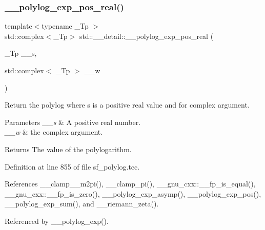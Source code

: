 \subsubsection{\texorpdfstring{\+\_\+\+\_\+polylog\+\_\+exp\+\_\+pos\+\_\+real()}{\_\_polylog\_exp\_pos\_real()}\hspace{0.1cm}{\footnotesize\ttfamily [1/2]}}
{\footnotesize\ttfamily template$<$typename \+\_\+\+Tp $>$ \\
std\+::complex$<$\+\_\+\+Tp$>$ std\+::\+\_\+\+\_\+detail\+::\+\_\+\+\_\+polylog\+\_\+exp\+\_\+pos\+\_\+real (\begin{DoxyParamCaption}\item[{\+\_\+\+Tp}]{\+\_\+\+\_\+s,  }\item[{std\+::complex$<$ \+\_\+\+Tp $>$}]{\+\_\+\+\_\+w }\end{DoxyParamCaption})}

Return the polylog where s is a positive real value and for complex argument.


\begin{DoxyParams}{Parameters}
{\em \+\_\+\+\_\+s} & A positive real number. \\
\hline
{\em \+\_\+\+\_\+w} & the complex argument. \\
\hline
\end{DoxyParams}
\begin{DoxyReturn}{Returns}
The value of the polylogarithm. 
\end{DoxyReturn}


Definition at line 855 of file sf\+\_\+polylog.\+tcc.



References \+\_\+\+\_\+clamp\+\_\+\_\+m2pi(), \+\_\+\+\_\+clamp\+\_\+pi(), \+\_\+\+\_\+gnu\+\_\+cxx\+::\+\_\+\+\_\+fp\+\_\+is\+\_\+equal(), \+\_\+\+\_\+gnu\+\_\+cxx\+::\+\_\+\+\_\+fp\+\_\+is\+\_\+zero(), \+\_\+\+\_\+polylog\+\_\+exp\+\_\+asymp(), \+\_\+\+\_\+polylog\+\_\+exp\+\_\+pos(), \+\_\+\+\_\+polylog\+\_\+exp\+\_\+sum(), and \+\_\+\+\_\+riemann\+\_\+zeta().



Referenced by \+\_\+\+\_\+polylog\+\_\+exp().

\mbox{\label{namespacestd_1_1____detail_a8a6390a3855283fc27a5d57dd736b62e}} 

